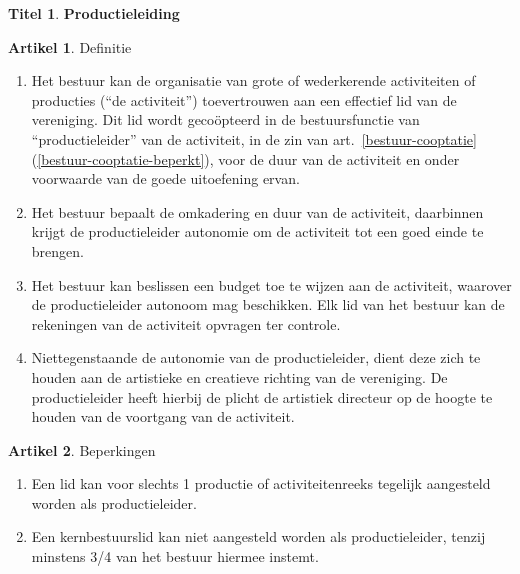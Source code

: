 \documentclass[a4paper,10pt]{article}
\theoremstyle{definition}
\newtheorem{titel}{\newline\Large Titel}
\newtheorem{artikelbase}{\large Artikel}
\newenvironment{artikel}
  {\begin{artikelbase}}
  {\smallskip
   \end{artikelbase}}
\newcommand{\ttext}[1]{\Large \textbf{#1} \normalsize}
\newcommand{\ttextenum}{\mbox{}}
\begin{document}
\begin{titel}\ttext{Productieleiding}

  \begin{artikel}Definitie\label{bestuur-productie}\ttextenum
    \begin{enumerate}
      \item
        Het bestuur kan de organisatie van grote of wederkerende activiteiten of producties (``de activiteit'') toevertrouwen aan een effectief lid van de vereniging.
        Dit lid wordt geco\"opteerd in de bestuursfunctie van ``productieleider'' van de activiteit, in de zin van art.~\ref{bestuur-cooptatie}(\ref{bestuur-cooptatie-beperkt}), voor de duur van de activiteit en onder voorwaarde van de goede uitoefening ervan.
      \item
        Het bestuur bepaalt de omkadering en duur van de activiteit, daarbinnen krijgt de productieleider autonomie om de activiteit tot een goed einde te brengen.
      \item
        Het bestuur kan beslissen een budget toe te wijzen aan de activiteit, waarover de productieleider autonoom mag beschikken.
        Elk lid van het bestuur kan de rekeningen van de activiteit opvragen ter controle.
      \item
        Niettegenstaande de autonomie van de productieleider, dient deze zich te houden aan de artistieke en creatieve richting van de vereniging.
        De productieleider heeft hierbij de plicht de artistiek directeur op de hoogte te houden van de voortgang van de activiteit.
    \end{enumerate}
  \end{artikel}

  \begin{artikel}Beperkingen\ttextenum
    \begin{enumerate}
      \item
        Een lid kan voor slechts 1 productie of activiteitenreeks tegelijk aangesteld worden als productieleider.
      \item
        Een kernbestuurslid kan niet aangesteld worden als productieleider, tenzij minstens 3/4 van het bestuur hiermee instemt.
    \end{enumerate}
  \end{artikel}
  

\end{titel}
\end{document}
